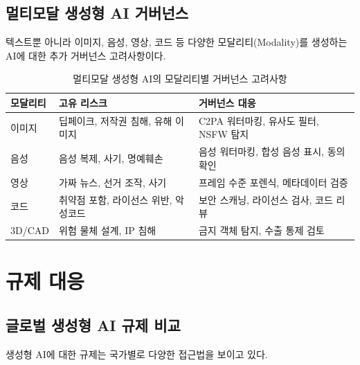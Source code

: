 \subsection{멀티모달 생성형 AI 거버넌스}

텍스트뿐 아니라 이미지, 음성, 영상, 코드 등 다양한 모달리티(Modality)를 생성하는 AI에 대한 추가 거버넌스 고려사항이다.

\begin{table}[htbp]
\centering
\caption{멀티모달 생성형 AI의 모달리티별 거버넌스 고려사항}
\label{tab:gen_multimodal}
\begin{tabularx}{\textwidth}{p{2cm}Xp{4cm}}
\toprule
\textbf{모달리티} & \textbf{고유 리스크} & \textbf{거버넌스 대응} \\
\midrule
이미지 & 딥페이크, 저작권 침해, 유해 이미지 & C2PA 워터마킹, 유사도 필터, NSFW 탐지 \\
음성 & 음성 복제, 사기, 명예훼손 & 음성 워터마킹, 합성 음성 표시, 동의 확인 \\
영상 & 가짜 뉴스, 선거 조작, 사기 & 프레임 수준 포렌식, 메타데이터 검증 \\
코드 & 취약점 포함, 라이선스 위반, 악성코드 & 보안 스캐닝, 라이선스 검사, 코드 리뷰 \\
3D/CAD & 위험 물체 설계, IP 침해 & 금지 객체 탐지, 수출 통제 검토 \\
\bottomrule
\end{tabularx}
\end{table}

\section{규제 대응}
\label{sec:gen.4}

\subsection{글로벌 생성형 AI 규제 비교}
\label{sec:gen.4.0}

생성형 AI에 대한 규제는 국가별로 다양한 접근법을 보이고 있다.

